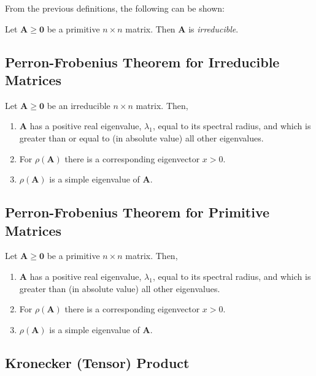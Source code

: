 From the previous definitions, the following can be shown:
\begin{lemma}
	Let $\mathbf{A} \ge \mathbf{0}$ be a primitive $n \times n$ matrix. Then $\mathbf{A}$ is \textit{irreducible}.
\end{lemma}

\subsection{Perron-Frobenius Theorem for Irreducible Matrices}

\begin{theorem}
Let $\mathbf{A} \ge \mathbf{0}$ be an irreducible $n \times n$ matrix. Then,
	\begin{enumerate}
		\item $\mathbf{A}$ has a positive real eigenvalue, $\lambda_{1}$, equal to its spectral radius, and which is greater than or equal to (in absolute value) all other eigenvalues.
		\item For $\rho(\mathbf{A})$ there is a corresponding eigenvector $x > 0$.
		\item $\rho(\mathbf{A})$ is a simple eigenvalue of $\mathbf{A}$.
	\end{enumerate}
\end{theorem}

\subsection{Perron-Frobenius Theorem for Primitive Matrices}

\begin{theorem}
Let $\mathbf{A} \ge \mathbf{0}$ be a primitive $n \times n$ matrix. Then,
	\begin{enumerate}
		\item $\mathbf{A}$ has a positive real eigenvalue, $\lambda_{1}$, equal to its spectral radius, and which is greater than (in absolute value) all other eigenvalues.
		\item For $\rho(\mathbf{A})$ there is a corresponding eigenvector $x > 0$.
		\item $\rho(\mathbf{A})$ is a simple eigenvalue of $\mathbf{A}$.
	\end{enumerate}
\end{theorem}

\subsection{Kronecker (Tensor) Product}

